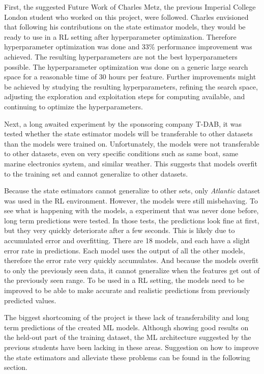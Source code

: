 \documentclass[12pt,twoside]{report}
\begin{document}
First, the suggested Future Work of Charles Metz, the previous Imperial College London student who worked on this project, were followed. Charles envisioned that following his contributions on the state estimator models, they would be ready to use in a RL setting after hyperparameter optimization. Therefore hyperparameter optimization was done and 33\% performance improvement was achieved. The resulting hyperparameters are not the best hyperparameters possible. The hyperparameter optimization was done on a generic large search space for a reasonable time of 30 hours per feature. Further improvements might be achieved by studying the resulting hyperparameters, refining the search space, adjusting the exploration and exploitation steps for computing available, and continuing to optimize the hyperparameters.

Next, a long awaited experiment by the sponsoring company T-DAB, it was tested whether the state estimator models will be transferable to other datasets than the models were trained on. Unfortunately, the models were not transferable to other datasets, even on very specific conditions such as same boat, same marine electronics system, and similar weather. This suggests that models overfit to the training set and cannot generalize to other datasets. 

Because the state estimators cannot generalize to other sets, only \textit{Atlantic} dataset was used in the RL environment. However, the models were still misbehaving. 
To see what is happening with the models, a experiment that was never done before, long term predictions were tested. In those tests, the predictions look fine at first, but they very quickly deteriorate after a few seconds. This is likely due to accumulated error and overfitting. There are 18 models, and each have a slight error rate in predictions. Each model uses the output of all the other models, therefore the error rate very quickly accumulates. And because the models overfit to only the previously seen data, it cannot generalize when the features get out of the previously seen range. To be used in a RL setting, the models need to be improved to be able to make accurate and realistic predictions from previously predicted values.

The biggest shortcoming of the project is these lack of transferability and long term predictions of the created ML models. Although showing good results on the held-out part of the training dataset, the ML architecture suggested by the previous students have been lacking in these areas. Suggestion on how to improve the state estimators and alleviate these problems can be found in the following  section.
\end{document}

